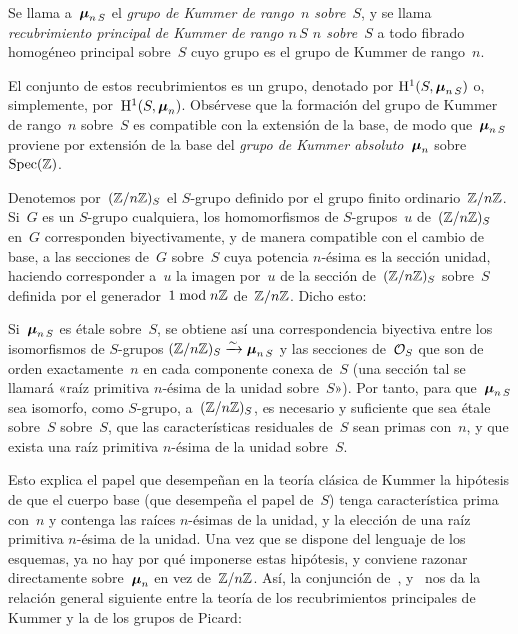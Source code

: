 \begin{definition}
\label{XI.6.2}
Se
llama a~$\bbmu_{n\,S}$ el \emph{grupo de Kummer de rango~$n$ sobre~$S$}, y
se llama \emph{recubrimiento principal de Kummer de rango
{$n\,S$}
{$n$ sobre~$S$}}
a todo fibrado homogéneo principal sobre~$S$ cuyo grupo es el grupo de
Kummer de rango~$n$.
\end{definition}

El conjunto de estos recubrimientos es un grupo, denotado por
$\H^1(S,\bbmu_{n\,S})$ o, simplemente, por~$\H^1(S,\bbmu_n)$. Obsérvese que
la formación del grupo de Kummer de rango~$n$ sobre~$S$ es compatible con la
extensión de la base, de modo que~$\bbmu_{n\,S}$ proviene por extensión de la
base del \emph{grupo de Kummer absoluto~$\bbmu_n$} sobre~$\Spec(\ZZ)$.

Denotemos por~$(\ZZ/n\ZZ)_S$ el $S$-grupo definido por el grupo finito
ordinario~$\ZZ/n\ZZ$. Si~$G$ es un $S$-grupo cualquiera, los homomorfismos
de $S$-grupos~$u$ de~$(\ZZ/n\ZZ)_S$ en~$G$ corresponden biyectivamente, y
de manera compatible con el cambio de base, a las secciones de~$G$ sobre~$S$
cuya potencia $n$-ésima es la sección unidad, haciendo corresponder a~$u$ la
imagen por~$u$ de la sección de~$(\ZZ/n\ZZ)_S$ sobre~$S$ definida por el
generador~$1\bmod n\ZZ$ de~$\ZZ/n\ZZ$. Dicho esto:

\begin{corollaire}
\label{XI.6.3}
Si~$\bbmu_{n\,S}$ es étale sobre~$S$, se obtiene así una correspondencia
biyectiva entre los isomorfismos de $S$-grupos
$(\ZZ/n\ZZ)_S\isomto\bbmu_{n\,S}$ y las secciones de~$\cal{O}_S$ que son
de orden exactamente~$n$ en cada componente conexa de~$S$ (una sección tal
se llamará «raíz primitiva $n$-ésima de la unidad sobre~$S$»). Por tanto,
para que~$\bbmu_{n\,S}$ sea isomorfo, como $S$-grupo, a~$(\ZZ/n\ZZ)_S$, es
necesario y suficiente que sea étale
{sobre~$S$}
{sobre~$S$,}
\ie que las características residuales de~$S$ sean primas con~$n$, y que
exista una raíz primitiva $n$-ésima de la unidad sobre~$S$.
\end{corollaire}

Esto explica el papel que desempeñan en la teoría clásica de Kummer la
hipótesis de que el cuerpo base (que desempeña el papel de~$S$) tenga
característica prima con~$n$ y contenga las raíces $n$-ésimas de la unidad,
y la elección de una raíz primitiva $n$-ésima de la unidad. Una vez que se
dispone del lenguaje de los esquemas, ya no hay por qué imponerse estas
hipótesis, y conviene razonar directamente sobre~$\bbmu_n$ en vez
de~$\ZZ/n\ZZ$. Así, la conjunción de~, 
y~ nos da la relación general siguiente entre la teoría de los
recubrimientos principales de Kummer y la de los grupos de Picard:


